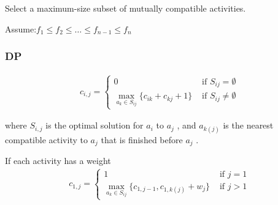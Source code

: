 \documentclass{article}
\begin{document}
Select a maximum-size subset of mutually compatible activities.\par
Assume:$f_1 \le f_2 \le \dots \le f_{n-1} \le f_n$

\subsubsection{DP}
\begin{align*}
    c_{i,j}=\left\{ \begin{array}{ll}
        0 & \text{ if }S_{ij}=\emptyset\\
        \max_{a_k \in S_{ij}}\{ c_{ik} + c_{kj} + 1 \} & \text{ if }S_{ij}\neq\emptyset
    \end{array} \right.
\end{align*}\par
where $S_{i,j}$ is the optimal solution for $a_i$ to $a_j$ , and $a_{k(j)}$ is the nearest compatible activity to $a_j$  that is finished before $a_j$ .

If each activity has a weight
\begin{align*}
    c_{1,j} = \left\{ \begin{array}{ll}
        1 & \text{ if }j=1\\
        \max_{a_k \in S_{ij}}\{ c_{1,j-1},c_{1, k(j)} + w_j \} & \text{ if }j>1
    \end{array}\right.
\end{align*}
\end{document}
